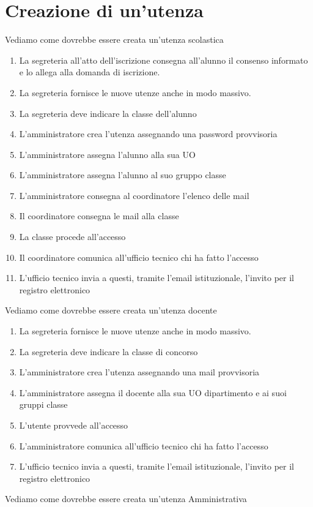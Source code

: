 \section{Creazione di un'utenza}
Vediamo come dovrebbe essere creata un'utenza scolastica
\begin{enumerate}
	\item La segreteria all'atto dell'iscrizione consegna all'alunno il consenso
	informato e lo allega alla domanda di iscrizione.
	\item La segreteria fornisce le nuove utenze anche in modo massivo.
	\item La segreteria deve indicare la classe dell'alunno
	\item L'amministratore crea l'utenza assegnando una password provvisoria
	\item L'amministratore assegna l'alunno alla sua UO
	\item L'amministratore assegna l'alunno al suo gruppo classe
	\item L'amministratore consegna al coordinatore l'elenco delle mail
	\item Il coordinatore  consegna le mail alla classe 
	\item La classe procede all'accesso
	\item Il coordinatore comunica all'ufficio tecnico chi ha fatto l'accesso
	\item L'ufficio tecnico invia  a questi, tramite l'email istituzionale, 
	l'invito  per il registro elettronico
\end{enumerate}
Vediamo come dovrebbe essere creata un'utenza docente
\begin{enumerate}
	\item La segreteria fornisce le nuove utenze anche in modo massivo.
	\item La segreteria deve indicare la classe di concorso
	\item L'amministratore crea l'utenza assegnando una mail provvisoria
	\item L'amministratore assegna il docente alla sua UO dipartimento e ai suoi 
	gruppi  classe
	\item L'utente provvede all'accesso
	\item L'amministratore  comunica all'ufficio tecnico chi ha fatto l'accesso
	\item L'ufficio tecnico invia  a questi, tramite l'email istituzionale, 
	l'invito  per il registro elettronico
\end{enumerate}
Vediamo come dovrebbe essere creata un'utenza Amministrativa
